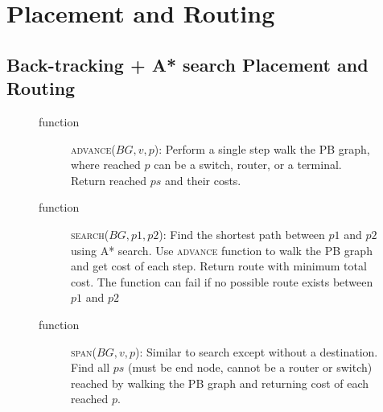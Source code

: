 \section{Placement and Routing} \label{sec:mapping}
\subsection{Back-tracking + A* search Placement and Routing}
\begin{figure}[!ht]
  \small
  \begin{description}
    \item [function] \textsc{advance}($BG,v,p$):
      Perform a single step walk the PB graph, where reached $p$ can be a switch, router, or a terminal.
      Return reached $ps$ and their costs.
    \item [function] \textsc{search}($BG,p1,p2$):
      Find the shortest path between $p1$ and $p2$ using A* search. Use \textsc{advance} function to walk
      the PB graph and get cost of each step. Return route with minimum total cost. The function can
      fail if no possible route exists between $p1$ and $p2$
    \item [function] \textsc{span}($BG,v,p$):
      Similar to search except without a destination. Find all $ps$ (must be end node, cannot be a router or switch) reached by 
      walking the PB graph and returning cost of each reached $p$.
  \end{description}


\end{figure}
